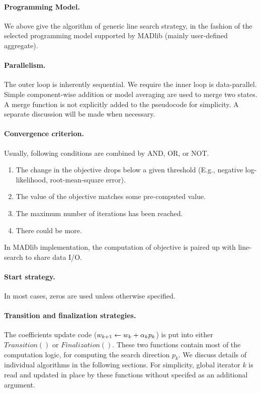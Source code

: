 \paragraph{Programming Model.}
We above give the algorithm of generic line search strategy, in the fashion of the selected programming model supported by MADlib (mainly user-defined aggregate).

\paragraph{Parallelism.}
The outer loop is inherently sequential.
We require the inner loop is data-parallel.
Simple component-wise addition or model averaging \cite{DBLP:conf/nips/DuchiAW10} are used to merge two states.
A merge function is not explicitly added to the pseudocode for simplicity.
A separate discussion will be made when necessary.

\paragraph{Convergence criterion.}
Usually, following conditions are combined by AND, OR, or NOT.
\begin{enumerate}
    \item The change in the objective drops below a given threshold (E.g., negative log-likelihood, root-mean-square error).
    \item The value of the objective matches some pre-computed value.
    \item The maximum number of iterations has been reached.
    \item There could be more.
\end{enumerate}
In MADlib implementation, the computation of objective is paired up with line-search to share data I/O.

\paragraph{Start strategy.}
In most cases, zeros are used unless otherwise specified.

\paragraph{Transition and finalization strategies.}
The coefficients update code ($w_{k+1} \leftarrow w_k + \alpha_k p_k$) is put into either $\mathit{Transition}()$ or $\mathit{Finalization}()$.
These two functions contain most of the computation logic, for computing the search direction $p_k$.
We discuss details of individual algorithms in the following sections.
For simplicity, global iterator $k$ is read and updated in place by these functions without specifed as an additional argument.

